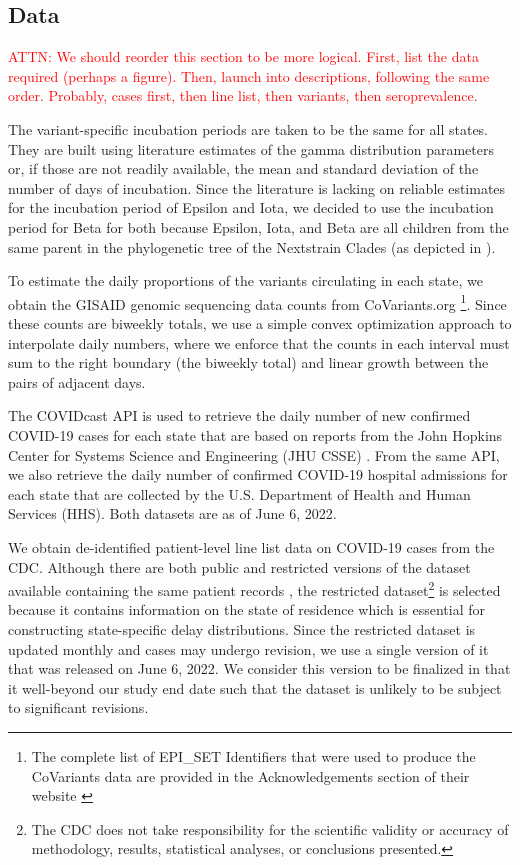 \documentclass{article}
\newcommand{\attn}[1]{\textcolor{red}{ATTN: #1}}
\begin{document}
\subsection{Data} 

\attn{We should reorder this section to be more logical. First, list the data required (perhaps a figure). Then, launch into descriptions, following the same order. Probably, cases first, then line list, then variants, then seroprevalence.}


The variant-specific incubation periods are taken to be the same for all states. They are built using literature estimates of the gamma distribution parameters or, if those are not readily available, the mean and standard deviation of the number of days of incubation. Since the literature is lacking on reliable estimates for the incubation period of Epsilon and Iota, we decided to use the incubation period for Beta for both because Epsilon, Iota, and Beta are all children from the same parent in the phylogenetic tree of the Nextstrain Clades (as depicted in \citet{hodcroft2021covariants}).

To estimate the daily proportions of the variants circulating in each state, we obtain the GISAID genomic sequencing data counts from CoVariants.org \citep{hodcroft2021covariants, elbe2017data}\footnote{The complete list of EPI\_SET Identifiers that were used to produce the CoVariants data are provided in the Acknowledgements section of their website \citep{hodcroft2021covariants}}. Since these counts are biweekly totals, we use a simple convex optimization approach to interpolate daily numbers, where we enforce that the counts in each interval must sum to the right boundary (the biweekly total) and linear growth between the pairs of adjacent days. 

The COVIDcast API \citep{reinhart2021open} is used to retrieve the daily number of new confirmed COVID-19 cases for each state that are based on reports from the John Hopkins Center for Systems Science and Engineering (JHU CSSE) \citep{dong2020interactive}. From the same API, we also retrieve the daily number of confirmed COVID-19 hospital admissions for each state that are collected by the U.S. Department of Health and Human Services (HHS). Both datasets are as of June 6, 2022.

We obtain de-identified patient-level line list data on COVID-19 cases from the CDC. Although there are both public and restricted versions of the dataset available containing the same patient records \citep{cdc2020casepub, cdc2020caserestr}, the restricted dataset\footnote{The CDC does not take responsibility for the scientific validity or accuracy of methodology, results, statistical analyses, or conclusions presented.} is selected because it contains information on the state of residence which is essential for constructing state-specific delay distributions. Since the restricted dataset is updated monthly and cases may undergo revision, we use a single version of it that was released on June 6, 2022. We consider this version to be finalized in that it well-beyond our study end date such that the dataset is unlikely to be subject to significant revisions.
\end{document}
